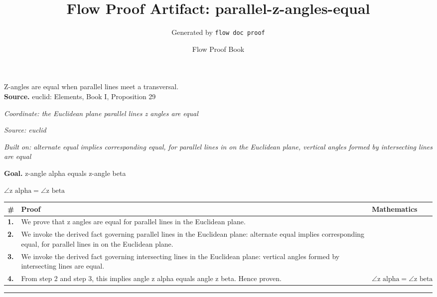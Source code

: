 \documentclass[11pt]{article}
\title{Flow Proof Artifact: parallel-z-angles-equal}
\author{Generated by \texttt{flow doc proof}}
\date{Flow Proof Book}
\theoremstyle{definition}
\begin{document}
\maketitle
Z-angles are equal when parallel lines meet a transversal.\\[0.5em]
\textbf{Source.} euclid: Elements, Book I, Proposition 29\\[0.5em]
\bigskip
{}\par
\smallskip\noindent\textit{Coordinate: the Euclidean plane \cdot parallel lines \cdot z angles are equal}\par
\smallskip\noindent\textit{Source: euclid}\par
\smallskip\noindent\textit{Built on: alternate equal implies corresponding equal, for parallel lines in on the Euclidean plane, vertical angles formed by intersecting lines are equal}\par
\medskip
\noindent\textbf{Goal.} z-angle alpha equals z-angle beta\par
\noindent$\displaystyle \angle \text{z alpha} = \angle \text{z beta}$\par
\medskip
\noindent
\begin{tabular}{@{} >{\raggedright\arraybackslash}p{} >{\raggedright\arraybackslash}p{} >{\raggedleft\arraybackslash}p{} @{}}
\textbf{\#} & \textbf{Proof} & \textbf{Mathematics} \\
\midrule
\textbf{1.} & We prove that z angles are equal for parallel lines in the Euclidean plane. & \\[0.45em]
\textbf{2.} & We invoke the derived fact governing parallel lines in the Euclidean plane: alternate equal implies corresponding equal, for parallel lines in on the Euclidean plane. & \\[0.45em]
\textbf{3.} & We invoke the derived fact governing intersecting lines in the Euclidean plane: vertical angles formed by intersecting lines are equal. & \\[0.45em]
\textbf{4.} & From step 2 and step 3, this implies angle z alpha equals angle z beta. Hence proven. & $\displaystyle \angle \text{z alpha} = \angle \text{z beta}$ \\[0.45em]
\bottomrule
\end{tabular}
\label{thm:Geometry-parallel lines-z_angles_are_equal}
\par\medskip\hrule
\end{document}
